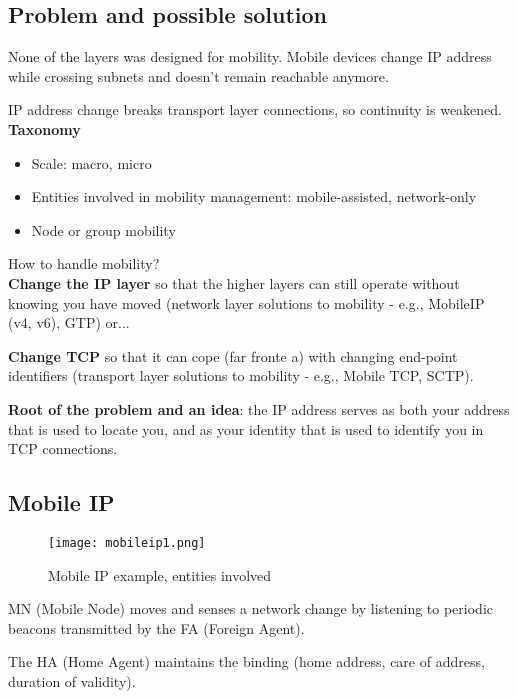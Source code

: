 \subsection{Problem and possible solution}

None of the layers was designed for mobility.
Mobile devices change IP address while crossing subnets and doesn't remain
reachable anymore.

IP address change breaks transport layer connections, so continuity is
weakened.\\

\textbf{Taxonomy}

\begin{itemize}
  \item Scale: macro, micro
  \item Entities involved in mobility management: mobile-assisted, network-only
  \item Node or group mobility
\end{itemize}

How to handle mobility?\\

\textbf{Change the IP layer} so that the higher layers can still operate
without knowing you have moved (network layer solutions to mobility - e.g.,
MobileIP (v4, v6), GTP) or...

\textbf{Change TCP} so that it can cope (far fronte a) with changing end-point
identifiers (transport layer solutions to mobility - e.g., Mobile TCP, SCTP).

\textbf{Root of the problem and an idea}: the IP address serves as both your
address that is used to locate you, and as your identity that is used to
identify you in TCP connections.

\subsection{Mobile IP}

\begin{figure}[H]
  \centering
  \texttt{[image: mobileip1.png]}
  \caption{Mobile IP example, entities involved}
  \label{fig:mobileip1}
\end{figure}

MN (Mobile Node) moves and senses a network change by listening to periodic
beacons transmitted by the FA (Foreign Agent).

The HA (Home Agent) maintains the binding (home address, care of address,
duration of validity).

